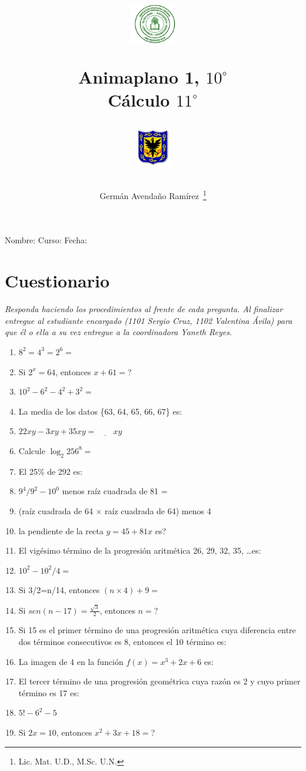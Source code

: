 \documentclass[11pt,twoside,letterpaper]{article}
\author{Germ\'an Avenda\~no Ram\'irez~\thanks{Lic. Mat. U.D., M.Sc. U.N.}}
\title{\begin{minipage}{.2\textwidth}
\includegraphics[height=1.75cm]{Images/logo-colegio.png}\end{minipage}
\begin{minipage}{.55\textwidth}
\begin{center}
Animaplano 1, $10^{\circ}$  \\
Cálculo $11^{\circ}$
\end{center}
\end{minipage}\hfill
\begin{minipage}{.2\textwidth}
\includegraphics[height=1.75cm]{Images/logo-sed.png} 
\end{minipage}}
\date{}
\begin{document}
\maketitle
Nombre: \hrulefill Curso: \underline{\hspace*{44pt}} Fecha: \underline{\hspace*{2.5cm}}
\section*{Cuestionario}
\textit{Responda haciendo los procedimientos al frente de cada pregunta. Al finalizar entregue al estudiante encargado (1101 Sergio Cruz, 1102 Valentina Ávila) para que él o ella a su vez entregue a la coordinadora Yaneth Reyes.}
\begin{enumerate}
 \item $8^{2}=4^{3}=2^{6}=$
 \item Si $2^{x}=64$, entonces $x+61=$?
 \item $10^{2}-6^{2}-4^{2}+3^{2}=$
 \item La media de los datos \{63, 64, 65, 66, 67\} es:
 \item $22xy-3xy+35xy=\underline{\hspace{24pt}}xy$
 \item Calcule $\log_{2}256^{8}=$
 \item El 25\% de 292 es:
 \item $9^{4}/9^{2}-10^{0}$ menos raíz cuadrada de 81 =
 \item (raíz cuadrada de 64 $\times$ raíz cuadrada de 64) menos 4
 \item la pendiente de la recta $y=45+81x$ es?
 \item El vigésimo término de la progresión aritmética 26, 29, 32, 35, \dots es:
 \item $10^{2}-10^{2}/4=$
 \item Si 3/2=n/14, entonces $(n\times4)+9=$
 \item Si $sen(n-17)=\frac{\sqrt{3}}{2}$, entonces $n=$?
 \item Si 15 es el primer término de una progresión aritmética cuya diferencia entre dos términos consecutivos es 8, entonces el 10 término es:
 \item La imagen de 4 en la función $f(x)=x^{3}+2x+6$ es:
 \item El tercer término de una progresión geométrica cuya razón es 2 y cuyo primer término es 17 es:
 \item $5!-6^{2}-5$
 \item Si $2x=10$, entonces $x^{2}+3x+18=$?

\end{enumerate}
\end{document}
